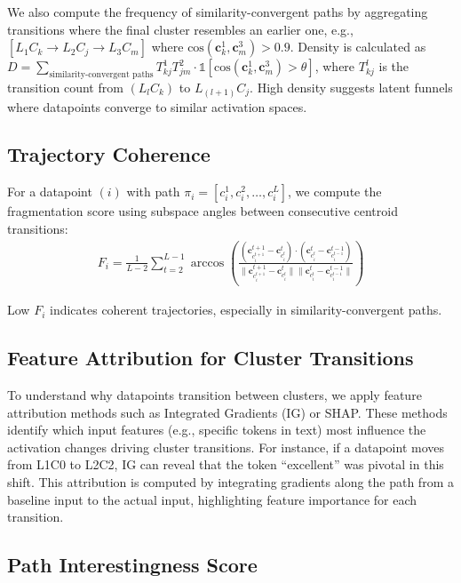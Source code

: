We also compute the frequency of similarity-convergent paths by aggregating transitions where the final cluster resembles an earlier one, e.g., $[L_1C_k \rightarrow L_2C_j \rightarrow L_3C_m]$ where $\text{cos}(\mathbf{c}_k^1, \mathbf{c}_m^3) > 0.9$. Density is calculated as $D = \sum_{\text{similarity-convergent paths}} T^1_{kj} T^2_{jm} \cdot \mathbb{1}[\text{cos}(\mathbf{c}_k^1, \mathbf{c}_m^3) > \theta]$, where $T^l_{kj}$ is the transition count from $(L_lC_k)$ to $L_{(l+1)}C_j$. High density suggests latent funnels where datapoints converge to similar activation spaces.

\subsection{Trajectory Coherence}

For a datapoint $(i)$ with path $\pi_i = [c_i^1, c_i^2, \dots, c_i^L]$, we compute the fragmentation score using subspace angles between consecutive centroid transitions: 
\begin{align}
F_i = \frac{1}{L-2} \sum_{t=2}^{L-1} \arccos\left(\frac{(\mathbf{c}_{c_i^{t+1}}^{t+1} - \mathbf{c}_{c_i^t}^t) \cdot (\mathbf{c}_{c_i^t}^t - \mathbf{c}_{c_i^{t-1}}^{t-1})}{\|\mathbf{c}_{c_i^{t+1}}^{t+1} - \mathbf{c}_{c_i^t}^t\| \|\mathbf{c}_{c_i^t}^t - \mathbf{c}_{c_i^{t-1}}^{t-1}\|}\right)
\end{align}

Low $F_i$ indicates coherent trajectories, especially in similarity-convergent paths.

\subsection{Feature Attribution for Cluster Transitions}

To understand why datapoints transition between clusters, we apply feature attribution methods such as Integrated Gradients (IG) or SHAP. These methods identify which input features (e.g., specific tokens in text) most influence the activation changes driving cluster transitions. For instance, if a datapoint moves from L1C0 to L2C2, IG can reveal that the token ``excellent'' was pivotal in this shift. This attribution is computed by integrating gradients along the path from a baseline input to the actual input, highlighting feature importance for each transition.

\subsection{Path Interestingness Score}

